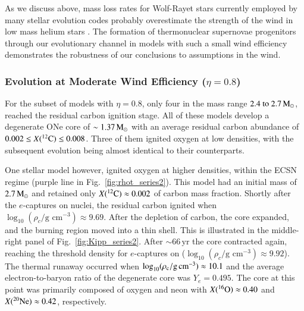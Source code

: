 \documentclass[main.tex]{subfiles}
\begin{document}
As we discuss above, mass loss rates for Wolf-Rayet stars currently employed by many stellar 
evolution codes probably overestimate the strength of the wind in low mass helium stars 
\citep[e.g.,][]{Vink:2017ujd, Sanders:2020:mnras}. The formation of thermonuclear supernovae 
progenitors through our evolutionary channel in models with such a small wind efficiency 
demonstrates the robustness of our conclusions to assumptions in the wind. 


\subsubsection{Evolution at Moderate Wind Efficiency ($\eta = 0.8$)}\label{sec:eta_0p8_evolution}

For the subset of models with $\eta=0.8$, only four in the mass range $\numrange{2.4}{2.7}\msun$, reached the residual carbon ignition stage. All of these models develop a degenerate ONe core of $\sim 1.37\msun$ with an average residual carbon abundance of $0.002 \leq X(\iso{C}{12}) \leq 0.008$. Three of them ignited oxygen at low densities, with the subsequent evolution being  almost identical to their \seriesone counterparts. 

One stellar model however, ignited oxygen at higher densities, within the ECSN regime (purple line in Fig.~\ref{fig:rhot_series2}). This model had an initial mass of $2.7\msun$ and retained only $X(\iso{C}{12}) \approx 0.002$ of carbon mass fraction. Shortly after the $e$-captures on  nuclei, the residual carbon ignited  when $\log_{10} (\rho_c / \text{g cm}^{-3}) \approx 9.69$. After the depletion of carbon, the core expanded, and the burning region moved into a thin shell. This is illustrated in the middle-right panel of Fig.~\ref{fig:Kipp_series2}.
After $\sim 66\,\text{yr}$ the core contracted  again, reaching the threshold density for $e$-captures on  ($\log_{10} (\rho_c / \text{g cm}^{-3}) \approx 9.92$). The thermal runaway occurred when $\logrhoc \approx 10.1$ and the average electron-to-baryon ratio of the degenerate core was  $Y_e = 0.495$. The core at this point was primarily composed of oxygen and neon with $X(\iso{O}{16}) \approx 0.40$ and $X(\iso{Ne}{20}) \approx 0.42$, respectively.
\end{document}
